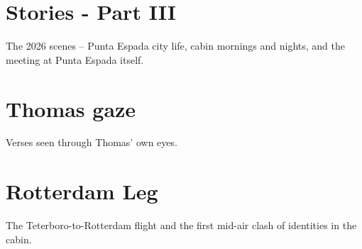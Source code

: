 \documentclass[a4paper]{memoir}
\begin{document}
\chapter{Stories - Part III}
The 2026 scenes -- Punta Espada city life, cabin mornings and nights, and the meeting at Punta Espada itself.


\chapter{Thomas gaze}
Verses seen through Thomas' own eyes.


\chapter{Rotterdam Leg}
The Teterboro-to-Rotterdam flight and the first mid-air clash of identities in the cabin.




















\end{document}

